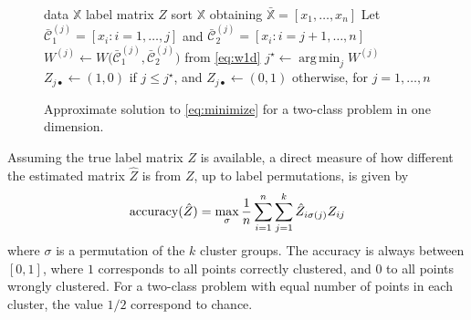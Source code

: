 \documentclass[aps,preprint,nofootinbib,floatfix]{revtex4-1}
\DeclareMathOperator*{\argmin}{arg\,min}
\newcommand\C{{\mathcal{C}}}
\begin{document}
\begin{figure}
\begin{algorithm}[H]\vspace{.5em}
\begin{algorithmic}[1]
\INPUT data $\mathbb{X}$
\OUTPUT label matrix $Z$
\STATE sort $\mathbb{X}$ obtaining 
$\bar{\mathbb{X}}= [ x_1,\dotsc,x_n ]$
        \STATE Let $\bar{\C}_1^{(j)} = [x_i: i=1,\dotsc,j]$ and 
                $\bar{\C}_2^{(j)} = [x_i : i=j+1,\dotsc,n]$
        \STATE  
            $W^{(j)} \leftarrow W \big( \bar{\C}_1^{(j)},\bar{\C}_2^{(j)}  
            \big)$ from \eqref{eq:w1d}
    \ENDFOR
    \STATE $j^\star \leftarrow \argmin_j W^{(j)}$ 
    \STATE $Z_{j\bullet} \leftarrow (1,0) $ if $j\le j^\star$, and
           $Z_{j\bullet} \leftarrow (0,1)$ otherwise, for $j=1,\dotsc,n$
\end{algorithmic}
\caption{
\label{algo1d}
Approximate solution to \eqref{eq:minimize} 
for a two-class problem in one dimension. \hspace{\fill}
}
\end{algorithm}
\end{figure}

Assuming the true label matrix $Z$ is available, a direct
measure of how different the estimated matrix $\hat{Z}$ 
is from $Z$, up to label
permutations, is given by
\begin{equation}
\label{eq:accuracy}
\textnormal{accuracy}(\hat{Z}) = \max_\sigma 
\dfrac{1}{n}\sum_{i=1}^n\sum_{j=1}^k \hat{Z}_{i \sigma(j)} Z_{ij}
\end{equation}
where $\sigma$ is a permutation
of the $k$ cluster groups. 
The accuracy is always between $[0,1]$, where
$1$ corresponds to all points correctly clustered, and 
$0$ to all points wrongly clustered.
For a two-class problem with equal
number of points in each cluster, the value $1/2$ correspond
to chance.
\end{document}
